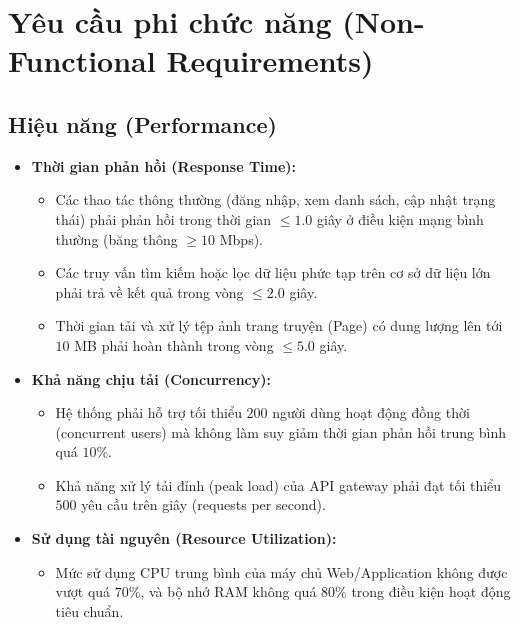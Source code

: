 \section{Yêu cầu phi chức năng (Non-Functional Requirements)}
\label{sec:srs_nfr}

\subsection{Hiệu năng (Performance)}
\label{subsec:nfr_performance}
\begin{itemize}
    \item \textbf{Thời gian phản hồi (Response Time):} 
    \begin{itemize}
        \item Các thao tác thông thường (đăng nhập, xem danh sách, cập nhật trạng thái) phải phản hồi trong thời gian $\le 1.0$ giây ở điều kiện mạng bình thường (băng thông $\ge 10$ Mbps).
        \item Các truy vấn tìm kiếm hoặc lọc dữ liệu phức tạp trên cơ sở dữ liệu lớn phải trả về kết quả trong vòng $\le 2.0$ giây.
        \item Thời gian tải và xử lý tệp ảnh trang truyện (Page) có dung lượng lên tới $10$ MB phải hoàn thành trong vòng $\le 5.0$ giây.
    \end{itemize}
    \item \textbf{Khả năng chịu tải (Concurrency):}
    \begin{itemize}
        \item Hệ thống phải hỗ trợ tối thiểu $200$ người dùng hoạt động đồng thời (concurrent users) mà không làm suy giảm thời gian phản hồi trung bình quá $10\%$.
        \item Khả năng xử lý tải đỉnh (peak load) của API gateway phải đạt tối thiểu $500$ yêu cầu trên giây (requests per second).
    \end{itemize}
    \item \textbf{Sử dụng tài nguyên (Resource Utilization):}
    \begin{itemize}
        \item Mức sử dụng CPU trung bình của máy chủ Web/Application không được vượt quá $70\%$, và bộ nhớ RAM không quá $80\%$ trong điều kiện hoạt động tiêu chuẩn.
    \end{itemize}
\end{itemize}

